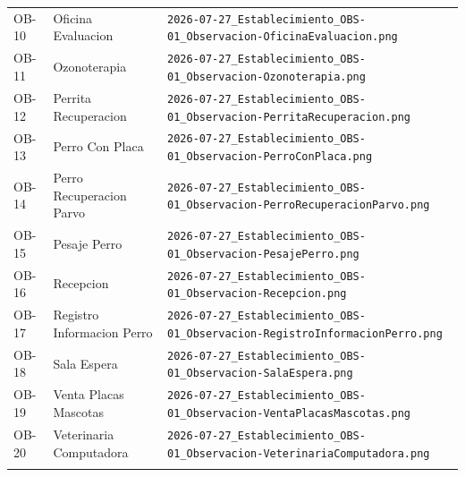 \documentclass[journal,onecolumn]{IEEEtran}
\begin{document}
{\begin{longtable}{@{}p{0.9cm} p{5.0cm} p{8.6cm}@{}}
			OB-10 & Oficina Evaluacion & \texttt{2026-07-27\_Establecimiento\_OBS-01\_Observacion-OficinaEvaluacion.png} \\ \addlinespace
			
			OB-11 & Ozonoterapia & \texttt{2026-07-27\_Establecimiento\_OBS-01\_Observacion-Ozonoterapia.png} \\ \addlinespace
			
			OB-12 & Perrita Recuperacion & \texttt{2026-07-27\_Establecimiento\_OBS-01\_Observacion-PerritaRecuperacion.png} \\ \addlinespace
			
			OB-13 & Perro Con Placa & \texttt{2026-07-27\_Establecimiento\_OBS-01\_Observacion-PerroConPlaca.png} \\ \addlinespace
			
			OB-14 & Perro Recuperacion Parvo & \texttt{2026-07-27\_Establecimiento\_OBS-01\_Observacion-PerroRecuperacionParvo.png} \\ \addlinespace
			
			OB-15 & Pesaje Perro & \texttt{2026-07-27\_Establecimiento\_OBS-01\_Observacion-PesajePerro.png} \\ \addlinespace
			
			OB-16 & Recepcion & \texttt{2026-07-27\_Establecimiento\_OBS-01\_Observacion-Recepcion.png} \\ \addlinespace
			
			OB-17 & Registro Informacion Perro & \texttt{2026-07-27\_Establecimiento\_OBS-01\_Observacion-RegistroInformacionPerro.png} \\ \addlinespace
			
			OB-18 & Sala Espera & \texttt{2026-07-27\_Establecimiento\_OBS-01\_Observacion-SalaEspera.png} \\ \addlinespace
			
			OB-19 & Venta Placas Mascotas & \texttt{2026-07-27\_Establecimiento\_OBS-01\_Observacion-VentaPlacasMascotas.png} \\ \addlinespace
			
			OB-20 & Veterinaria Computadora & \texttt{2026-07-27\_Establecimiento\_OBS-01\_Observacion-VeterinariaComputadora.png} \\ \addlinespace
			
		\end{longtable}
	}
	
	
\end{document}
